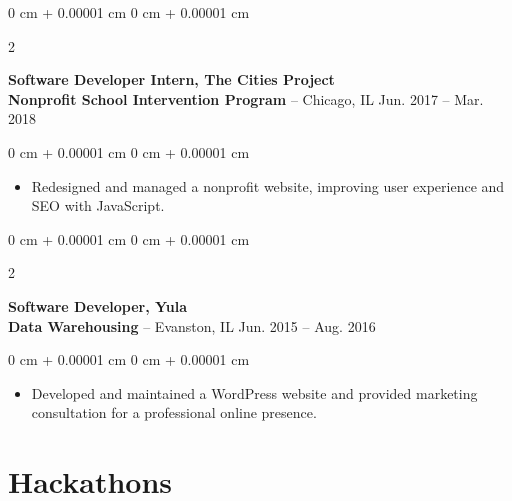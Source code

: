 \documentclass[10pt, letterpaper]{article}
\newenvironment{highlights}{
    \begin{itemize}[
        topsep=0.10 cm,
        parsep=0.10 cm,
        partopsep=0pt,
        itemsep=0pt,
        leftmargin=0 cm + 10pt
    ]
}{
    \end{itemize}
} %
\newenvironment{onecolentry}{
    \begin{adjustwidth}{
        0 cm + 0.00001 cm
    }{
        0 cm + 0.00001 cm
    }
}{
    \end{adjustwidth}
} %
\newenvironment{twocolentry}[2][]{
    \onecolentry
    \def\secondColumn{#2}
    \setcolumnwidth{\fill, 5 cm}
    \begin{paracol}{2}
}{
    \switchcolumn \raggedleft \secondColumn
    \end{paracol}
    \endonecolentry
} %
\begin{document}
        \vspace{0.2 cm}

        \begin{twocolentry}{
            Jun. 2017 – Mar. 2018
        }
            \textbf{Software Developer Intern, The Cities Project\\
            Nonprofit School Intervention Program} -- Chicago, IL\end{twocolentry}

        \vspace{0.10 cm}
        \begin{onecolentry}
            \begin{highlights}
                \item Redesigned and managed a nonprofit website, improving user experience and SEO with JavaScript.
            \end{highlights}
        \end{onecolentry}

        
        \vspace{0.2 cm}

        \begin{twocolentry}{
            Jun. 2015 – Aug. 2016
        }
            \textbf{Software Developer, Yula\\
            Data Warehousing} -- Evanston, IL\end{twocolentry}

        \vspace{0.10 cm}
        \begin{onecolentry}
            \begin{highlights}
                \item Developed and maintained a WordPress website and provided marketing consultation for a professional online presence.
            \end{highlights}
        \end{onecolentry}



    
    \section{Hackathons}
\end{document}
